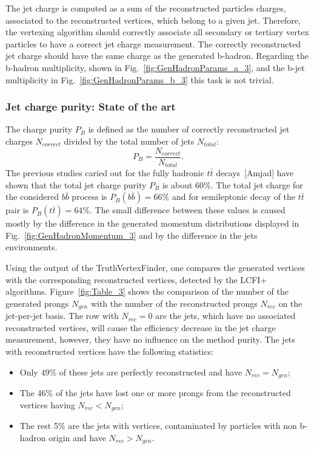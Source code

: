 The jet charge is computed as a sum of the reconstructed particles charges, associated to the reconstructed vertices, which belong to a given jet. 
Therefore, the vertexing algorithm should correctly associate all secondary or tertiary vertex particles to have a correct jet charge measurement. 
The correctly reconstructed jet charge should have the same  charge as the generated b-hadron. 
Regarding the b-hadron multiplicity, shown in Fig.~\ref{fig:GenHadronParams_a_3}, and the b-jet multiplicity in Fig.~\ref{fig:GenHadronParams_b_3} this task is not trivial. 

\subsubsection{Jet charge purity: State of the art}
The charge purity $P_B$ is defined as the number of correctly reconstructed jet charges $N_{correct}$ divided by the total number of jets $N_{total}$:
\begin{equation}
	\label{formula:Purity_3}
	P_B = \frac{N_{correct}}{N_{total}}.
\end{equation} 
The previous studies caried out for the fully hadronic $t\bar{t}$ decays~[Amjad] have shown that the total jet charge purity $P_B$ is about 60\%.
The total jet charge for the considered $b\bar{b}$ process  is $P_B(b\bar{b}) = 66\%$ and for semileptonic decay of the  $t\bar{t}$ pair is $P_B(t\bar{t}) = 64\%$. 
The small difference between these values is caused mostly by the difference in the generated momentum  distributions displayed in Fig.~\ref{fig:GenHadronMomentum_3} and by the difference in the jets environments.

Using the output of the TruthVertexFinder, one compares the generated vertices with the corresponding reconstructed vertices, detected by the LCFI+ algorithms. 
Figure~\ref{fig:Table_3} shows the comparison of the number of the generated prongs $N_{gen}$ with the number of the reconstructed prongs $N_{rec}$ on the jet-per-jet basis. 
The row with $N_{rec} = 0$ are the jets, which have no associated reconstructed vertices, will cause the efficiency decrease in the jet charge measurement, however, they have no influence on the method purity.
The jets with reconstructed vertices have the following statistics:
\begin{itemize}
\item Only 49\% of these jets are perfectly reconstructed and have $N_{rec}=N_{gen}$;
\item The 46\% of the jets have lost one or more prongs from the reconstructed vertices having $N_{rec}<N_{gen}$;
\item The rest 5\% are the jets with vertices, contaminated by particles with non b-hadron origin and have $N_{rec}>N_{gen}$.
\end{itemize}

